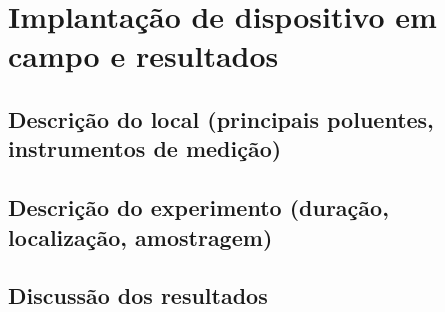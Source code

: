 \chapter{Implantação de dispositivo em campo e resultados}\label{cap:field-monit-results}

\section{Descrição do local (principais poluentes, instrumentos de medição)}

\section{Descrição do experimento (duração, localização, amostragem)}

\section{Discussão dos resultados}
